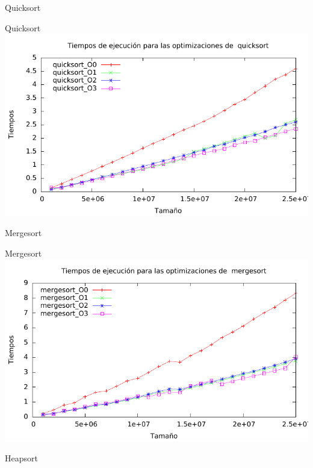 \documentclass[10pt,compress,usetitleprogressbar,mathserif]{beamer}
\begin{document}
\begin{frame}{Quicksort}
	
\end{frame}

\begin{frame}{Quicksort}
	\includegraphics[width = \textwidth ]{img/quicksort_optim_g.pdf}
\end{frame}

\begin{frame}{Mergesort}
	
\end{frame}

\begin{frame}{Mergesort}
	\includegraphics[width = \textwidth ]{img/mergesort_optim_g.pdf}
\end{frame}

\begin{frame}{Heapsort}
	
\end{frame}
\end{document}
